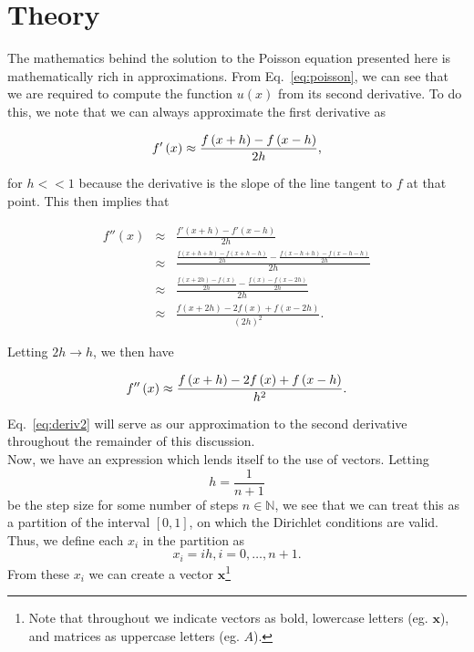 \documentclass[12pt]{article}
\numberwithin{equation}{section}
\begin{document}
\section{Theory}
\label{sec:theory}
The mathematics behind the solution to the Poisson equation presented here is mathematically rich in approximations.  From Eq.~\ref{eq:poisson}, we can see that we are required to compute the function $u\left(x\right)$ from its second derivative.  To do this, we note that we can always approximate the first derivative as

\begin{equation}
\vspace{.2cm}
\label{eq:deriv1}
f'\left(x\right) \approx \frac{f\left(x+h\right)-f\left(x-h\right)}{2h},
\end{equation}

\noindent for $h<<1$ because the derivative is the slope of the line tangent to $f$ at that point.  This then implies that

$$\begin{array}{ccc} f''\left(x\right)&\approx&\frac{f'\left(x+h\right)-f'\left(x-h\right)}{2h} \\
&\approx&\frac{\frac{f\left(x+h+h\right)-f\left(x+h-h\right)}{2h} - \frac{f\left(x-h+h\right)-f\left(x-h-h\right)}{2h}}{2h} \\
&\approx&\frac{\frac{f\left(x+2h\right)-f\left(x\right)}{2h} - \frac{f\left(x\right)-f\left(x-2h\right)}{2h}}{2h} \\
&\approx&\frac{f\left(x+2h\right)-2f\left(x\right)+f\left(x-2h\right)}{\left(2h\right)^{2}}.\end{array}$$

\noindent Letting $2h\rightarrow h$, we then have

\begin{equation}
\vspace{.2cm}
\label{eq:deriv2}
f''\left(x\right)\approx\frac{f\left(x+h\right)-2f\left(x\right)+f\left(x-h\right)}{h^{2}}.
\end{equation}

\noindent Eq.~\ref{eq:deriv2} will serve as our approximation to the second derivative throughout the remainder of this discussion.  
\\\indent Now, we have an expression which lends itself to the use of vectors.  Letting $$h = \frac{1}{n+1}$$ be the step size for some number of steps $n\in\mathbb{N}$, we see that we can treat this as a partition of the interval $\left[0,1\right]$, on which the Dirichlet conditions are valid.  Thus, we define each $x_{i}$ in the partition as $$x_{i}=ih,i=0,\ldots,n+1.$$  From these $x_{i}$ we can create a vector $\textbf{x}$\footnote{Note that throughout we indicate vectors as bold, lowercase letters (eg. $\textbf{x}$), and matrices as uppercase letters (eg. $A$).}
\end{document}
